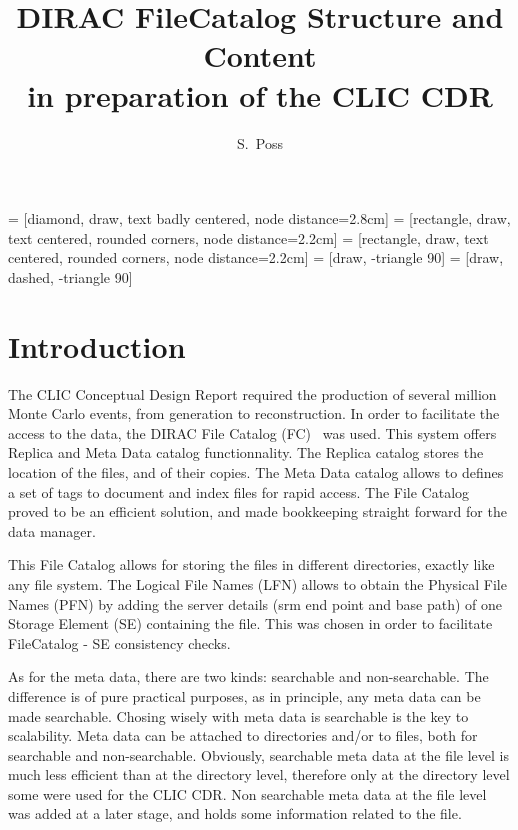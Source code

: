 \documentclass[11pt,a4paper]{scrartcl}
\begin{document}
\begin{titlepage}
%
\mydocversion
\title{DIRAC FileCatalog Structure and Content\\ in preparation of the CLIC CDR}
\author{S.~Poss}
 = [diamond, draw, text badly centered, node distance=2.8cm]
 = [rectangle, draw, text centered, rounded corners, node distance=2.2cm]
 = [rectangle, draw, text centered, rounded corners, node distance=2.2cm]
 = [draw, -triangle 90]
 = [draw, dashed, -triangle 90]

{}

\tableofcontents
\end{titlepage}

\section{Introduction}
The CLIC Conceptual Design Report required the production of several million
Monte Carlo events, from generation to reconstruction. In order to facilitate
the access to the data, the DIRAC File Catalog (FC)~\cite{diracfc} was used.
This system offers Replica and Meta Data catalog functionnality. The Replica
catalog stores the location of the files, and of their copies. The Meta Data
catalog allows to defines a set of tags to document and index files for rapid
access. The File Catalog proved to be an efficient solution, and made
bookkeeping straight forward for the data manager.

This File Catalog allows for storing the files in different directories,
exactly like any file system. The Logical File Names (LFN) allows to obtain the 
Physical File Names (PFN) by adding the server details (srm end point and base 
path) of one Storage Element (SE) containing the file. This was chosen in order 
to facilitate FileCatalog - SE consistency checks.

As for the meta data, there are two kinds: searchable and non-searchable.
The difference is of pure practical purposes, as in principle, any meta data
can be made searchable. Chosing wisely with meta data is searchable is the key
to scalability. Meta data can be attached to directories and/or to files, both
for searchable and non-searchable. Obviously, searchable meta data at the file 
level is much less efficient than at the directory level, therefore only at the
directory level some were used for the CLIC CDR. Non searchable meta data at
the file level was added at a later stage, and holds some information related 
to the file.
\end{document}
